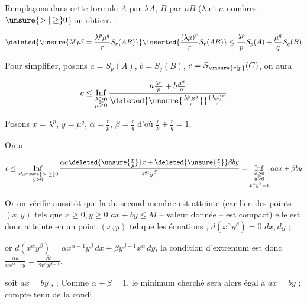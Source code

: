 
Remplaçons dans cette formule $A$ par $\lambda A$, $B$ par $\mu B$ ($\lambda$ et $\mu$ nombres $\unsure{>| \geq}0$) on obtient :

\[
\deleted{\unsure{\lambda^p\mu^q=\frac{\lambda^p\mu^q}{r}S_r(AB)}}
\inserted{\frac{(\lambda\mu)^r}{r}S_r(AB)}
\leq\frac{\lambda^p}{p}S_p(A)+\frac{\mu^q}{q}S_q(B)
\]



Pour simplifier, posons $a=S_p(A)$, $b=S_q(B)$, $c=S_{\unsure{r|p}}(C)$, on aura

\[
c\leq\mathop{\mathrm{Inf}}\limits_{\substack{\lambda\geq0\\\mu\geq0}}
\frac{a\frac{\lambda^p}{p}+b\frac{\mu^q}{q}}
{\deleted{\unsure{\frac{\lambda^p\mu^q}{r}}}\frac{(\lambda\mu)^r}{r}}
\]


Posons $x=\lambda^p$, $y=\mu^q$, $\alpha=\frac rp$, $\beta=\frac rq$ d'où \unsure{,} \uline{$\frac rp+\frac rq=1$},

On a

\[
c\leq\mathop{\mathrm{Inf}}\limits_{\substack{x\unsure{>|\geq}0\\y>0}}
\frac{\alpha a\deleted{\unsure{\frac rp}}x+\deleted{\unsure{\frac rq}}\beta by}{x^\alpha y^\beta}
=\mathop{\mathrm{Inf}}\limits_{\substack{x\geq0\\y\geq0\\x^\alpha y^\beta=1}}\alpha a x+\beta by
\]

Or on vérifie aussitôt que la  du second membre est atteinte (car l'en des points $(x,y)$ tels que $x\geq0,y\geq0$ $ax+by\leq M$ -- valeur donnée -- est compact) elle est donc atteinte en un point $(x,y)$ tel que les équations , $d(x^\alpha y^\beta)=0$   $dx,dy$  ;

or $d(x^\alpha y^\beta)=\alpha x^{\alpha-1}y^\beta\,dx+\beta y^{\beta-1}x^\alpha\,dy$,  la condition d'extremum est donc $\frac{\alpha a}{\alpha x^{\alpha-1}y}=\frac{\beta b}{\beta x^\alpha y^{\beta-1}}$,

soit $ax=by$ \deleted{\unsure{$=$}},   ;  Comme $\alpha+\beta=1$, le minimum cherché sera alors  égal à $ax=by$ ; compte tenu de la condi%
